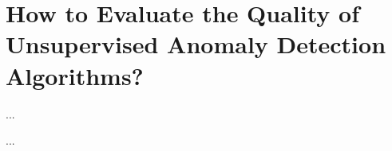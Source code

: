 \chapter{How to Evaluate the Quality of Unsupervised Anomaly Detection Algorithms?}
\label{chap:evaluation}

\begin{chapabstract}
...
\end{chapabstract}

...